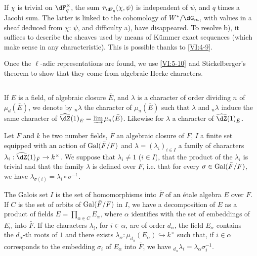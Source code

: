 If $\chi$ is trivial on $\dF_q^\times$, the sum $\tau_{\dF_q}(\chi,\psi)$
is independent of $\psi$, and $q$ times a Jacobi sum. The latter is
linked to the cohomology of $W^\ast/\dG_m$, with values in a sheaf
deduced from $\chi$: $\psi$, and difficulty a), have disappeared. To
resolve b), it suffices to describe the sheaves used by means of
K\"ummer exact sequences (which make sense in any characteristic). This is
possible thanks to \ref{VI:4-9}.

Once the $\ell$-adic representations are found, we use
\ref{VI:5-10} and Stickelberger's theorem to show that they
come from algebraic Hecke characters. 





\subsection{}\label{VI:6-1}

If $E$ is a field, of algebraic closure $\bar E$, and $\lambda$ is
a character of order dividing $n$ of $\mu_d(\bar E)$, we denote by $_n\lambda$ the
character of $\mu_n(\bar E)$ such that $\lambda$ and $_n \lambda$ induce the
same character of $\widehat\dZ(1)_{\bar E} = \varinjlim \mu_n(\bar E)$. Likewise
for $\lambda$ a character of $\widehat\dZ(1)_{\bar E}$.

Let $F$ and $k$ be two number fields, $\bar F$ an algebraic closure of
$F$, $I$ a finite set equipped with an action of $\operatorname{Gal}(\bar F/F)$ and
$\lambda=(\lambda_i)_{i\in I}$ a family of characters
$\lambda_i:\widehat\dZ(1)_{\bar F} \to k^\times$. We suppose that
$\lambda_i\ne 1$ ($i\in I$), that the product of the $\lambda_i$ is trivial and
that the family $\lambda$ is defined over $F$, i.e. that for every
$\sigma\in \operatorname{Gal}(\bar F/F)$, we have
$\lambda_{\sigma(i)}=\lambda_i\circ \sigma^{-1}$.

The Galois set $I$ is the set of homomorphisms into $\bar F$ of an
étale algebra $E$ over $F$. If $C$ is the set of orbits of
$\operatorname{Gal}(\bar F/F)$ in $I$, we have a decomposition of $E$ as a product of fields
$E=\prod_{\alpha\in C} E_\alpha$, where $\alpha$ identifies with the set of
embeddings of $E_\alpha$ into $\bar F$. If the characters $\lambda_i$, for
$i\in \alpha$, are of order $d_\alpha$, the field $E_\alpha$ contains the
$d_\alpha$-th roots of $1$ and there exists
$\lambda_\alpha:\mu_{d_\alpha}(E_\alpha) \hookrightarrow k^\times$ such that, if
$i\in \alpha$ corresponds to the embedding $\sigma_i$ of $E_\alpha$ into $\bar F$,
we have $_{d_\alpha} \lambda_i = \lambda_\alpha \sigma_i^{-1}$. 





